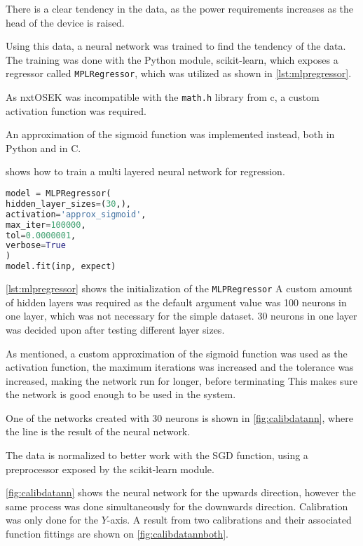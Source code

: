 
There is a clear tendency in the data, as the power requirements increases as the head of the device is raised.

Using this data, a neural network was trained to find the tendency of the data.
The training was done with the Python module, scikit-learn\cite{scikit-learn}, which exposes a regressor called \texttt{MPLRegressor}, which was utilized as shown in \autoref{lst:mlpregressor}.


As nxtOSEK was incompatible with the \texttt{math.h} library from c, a custom activation function was required.

An approximation of the sigmoid function was implemented instead, both in Python and in C.

shows how to train a multi layered neural network for regression.

\begin{lstlisting}[language=python,label={lst:mlpregressor},caption={Training a MLPRegressor with scikit}]
model = MLPRegressor(
hidden_layer_sizes=(30,),
activation='approx_sigmoid',
max_iter=100000,
tol=0.0000001,
verbose=True
)
model.fit(inp, expect)

\end{lstlisting}

\autoref{lst:mlpregressor} shows the initialization of the \texttt{MLPRegressor} 
A custom amount of hidden layers was required as the default argument value was 100 neurons in one layer, which was not necessary for the simple dataset.
30 neurons in one layer was decided upon after testing different layer sizes.

As mentioned, a custom approximation of the sigmoid function was used as the activation function, the maximum iterations was increased and the tolerance was increased, making the network run for longer, before terminating
This makes sure the network is good enough to be used in the system.

One of the networks created with 30 neurons is shown in \autoref{fig:calibdatann}, where the line is the result of the neural network.

The data is normalized to better work with the SGD function, using a preprocessor exposed by the scikit-learn module.


\autoref{fig:calibdatann} shows the neural network for the upwards direction, however the same process was done simultaneously for the downwards direction.
Calibration was only done for the $Y$-axis.
A result from two calibrations and their associated function fittings are shown on \autoref{fig:calibdatannboth}.


